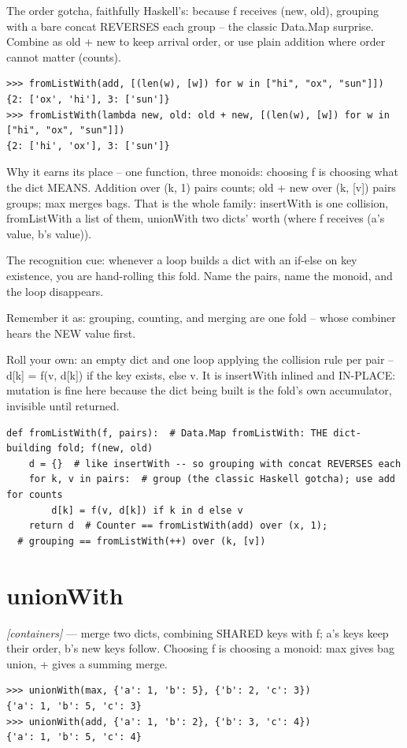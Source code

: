 \documentclass[11pt,letterpaper]{book}
\begin{document}
The order gotcha, faithfully Haskell's: because f receives (new, old), grouping with a bare concat REVERSES each group -- the classic Data.Map surprise. Combine as old + new to keep arrival order, or use plain addition where order cannot matter (counts).

\begin{lstlisting}[style=spec]
>>> fromListWith(add, [(len(w), [w]) for w in ["hi", "ox", "sun"]])
{2: ['ox', 'hi'], 3: ['sun']}
>>> fromListWith(lambda new, old: old + new, [(len(w), [w]) for w in ["hi", "ox", "sun"]])
{2: ['hi', 'ox'], 3: ['sun']}
\end{lstlisting}

Why it earns its place -- one function, three monoids: choosing f is choosing what the dict MEANS. Addition over (k, 1) pairs counts; old + new over (k, [v]) pairs groups; max merges bags. That is the whole family: insertWith is one collision, fromListWith a list of them, unionWith two dicts' worth (where f receives (a's value, b's value)).


The recognition cue: whenever a loop builds a dict with an if-else on key existence, you are hand-rolling this fold. Name the pairs, name the monoid, and the loop disappears.


Remember it as: grouping, counting, and merging are one fold -- whose combiner hears the NEW value first.


Roll your own: an empty dict and one loop applying the collision rule per pair -- d[k] = f(v, d[k]) if the key exists, else v. It is insertWith inlined and IN-PLACE: mutation is fine here because the dict being built is the fold's own accumulator, invisible until returned.

\begin{lstlisting}[style=code]
def fromListWith(f, pairs):  # Data.Map fromListWith: THE dict-building fold; f(new, old)
    d = {}  # like insertWith -- so grouping with concat REVERSES each
    for k, v in pairs:  # group (the classic Haskell gotcha); use add for counts
        d[k] = f(v, d[k]) if k in d else v
    return d  # Counter == fromListWith(add) over (x, 1);
  # grouping == fromListWith(++) over (k, [v])
\end{lstlisting}

\section{unionWith}
\noindent\textit{[containers]} --- merge two dicts, combining SHARED keys with f; a's keys keep their order, b's new keys follow. Choosing f is choosing a monoid: max gives bag union, + gives a summing merge.
\begin{lstlisting}[style=spec]
>>> unionWith(max, {'a': 1, 'b': 5}, {'b': 2, 'c': 3})
{'a': 1, 'b': 5, 'c': 3}
>>> unionWith(add, {'a': 1, 'b': 2}, {'b': 3, 'c': 4})
{'a': 1, 'b': 5, 'c': 4}
\end{lstlisting}
\end{document}

